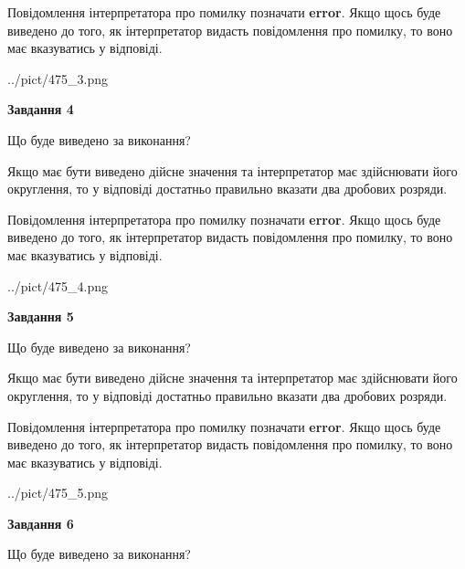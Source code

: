 \documentclass[12pt, ukrainian]{article}
\begin{document}
{\begin {Large}
Повідомлення інтерпретатора про помилку позначати \textbf{error}.
Якщо щось буде виведено до того, як інтерпретатор видасть повідомлення про помилку, 
то воно має вказуватись у відповіді. \par

\begin{center}
	{../pict/475_3.png}
\end{center}
\newpage

{\begin {center}\textbf{Завдання 4}\end {center}}\par
Що буде виведено за виконання? \par

Якщо має бути виведено дійсне значення та інтерпретатор має здійснювати його округлення, 
то у відповіді достатньо правильно вказати два дробових розряди.

Повідомлення інтерпретатора про помилку позначати \textbf{error}.
Якщо щось буде виведено до того, як інтерпретатор видасть повідомлення про помилку, 
то воно має вказуватись у відповіді. \par

\begin{center}
	{../pict/475_4.png}
\end{center}
\newpage

{\begin {center}\textbf{Завдання 5}\end {center}}\par
Що буде виведено за виконання? \par

Якщо має бути виведено дійсне значення та інтерпретатор має здійснювати його округлення, 
то у відповіді достатньо правильно вказати два дробових розряди.

Повідомлення інтерпретатора про помилку позначати \textbf{error}.
Якщо щось буде виведено до того, як інтерпретатор видасть повідомлення про помилку, 
то воно має вказуватись у відповіді. \par

\begin{center}
	{../pict/475_5.png}
\end{center}
\newpage

{\begin {center}\textbf{Завдання 6}\end {center}}\par
Що буде виведено за виконання? \par


\end{Large}}
\end{document}

